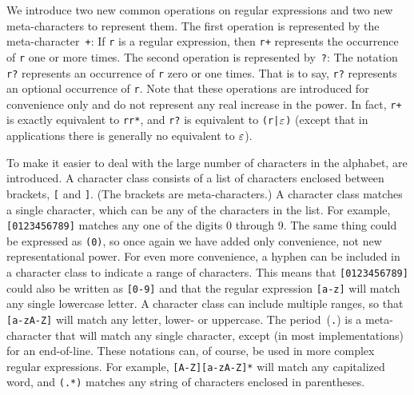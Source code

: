 
We introduce two new common operations on regular expressions and two
new meta-characters to represent them.
The first operation is represented by the meta-character~\texttt{+}:
If \texttt{r} is a regular expression, then \texttt{r+} represents the
occurrence of \texttt{r} one or more times.  The second operation
is represented by~\texttt{?}: The notation \texttt{r?} represents an occurrence of \texttt{r} 
zero or one times.  That is to say, \texttt{r?} represents an optional 
occurrence of \texttt{r}.  Note that these operations are introduced
for convenience only and do not represent any real increase
in the power.  In fact, \texttt{r+} is exactly equivalent to
\texttt{rr*}, and \texttt{r?} is equivalent to \texttt{(r|$\varepsilon$)} 
(except that in applications there is generally no equivalent to $\varepsilon$).

To make it easier to deal with the large number of characters in the
alphabet,  are introduced.  A character class
consists of a list of characters enclosed between brackets, \texttt{[} and
\texttt{]}.  (The brackets are meta-characters.)  A character class
matches a single character, which can be any of the characters in
the list.  For example, \texttt{[0123456789]} matches any one of
the digits 0 through 9.  The same thing could be expressed
as \texttt{(0)}, so once again
we have added only convenience, not new representational power.
For even more convenience, a hyphen can be included in a character
class to indicate a range of characters.  This means that
\texttt{[0123456789]} could also be written as \texttt{[0-9]}
and that the regular expression \texttt{[a-z]} will match any
single lowercase letter.  A character class can include multiple
ranges, so that \texttt{[a-zA-Z]} will match any letter, lower- or
uppercase.  The period~(\texttt{.}) is a meta-character that will
match any single character, except (in most implementations)
for an end-of-line.
These notations can, of course, be used in more complex
regular expressions.  For example, \texttt{[A-Z][a-zA-Z]*}
will match any capitalized word, and \texttt{\bk(.*\bk)} matches
any string of characters enclosed in parentheses.


